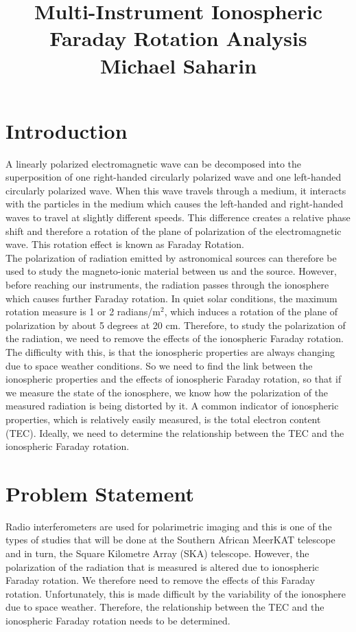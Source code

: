 \documentclass[a4paper,12pt,notitlepage]{article}
\begin{document}
\pagestyle{plain}
\title{\textbf{\huge{Multi-Instrument Ionospheric Faraday Rotation Analysis}\\
\large{Michael Saharin}}}
\maketitle

\section{Introduction}

A linearly polarized electromagnetic wave can be decomposed into the superposition of one right-handed circularly polarized wave and one left-handed circularly polarized wave. When this wave travels through a medium, it interacts with the particles in the medium which causes the left-handed and right-handed waves to travel at slightly different speeds. This difference creates a relative phase shift and therefore a rotation of the plane of polarization of the electromagnetic wave. This rotation effect is known as Faraday Rotation. \\

The polarization of radiation emitted by astronomical sources can therefore be used to study the magneto-ionic material between us and the source. However, before reaching our instruments, the radiation passes through the ionosphere which causes further Faraday rotation. In quiet solar conditions, the maximum rotation measure is 1 or 2 radians/m$^2$, which induces a rotation of the plane of polarization by about 5 degrees at 20 cm. Therefore, to study the polarization of the radiation, we need to remove the effects of the ionospheric Faraday rotation. The difficulty with this, is that the ionospheric properties are always changing due to space weather conditions. So we need to find the link between the ionospheric properties and the effects of ionospheric Faraday rotation, so that if we measure the state of the ionosphere, we know how the polarization of the measured radiation is being distorted by it. A common indicator of ionospheric properties, which is relatively easily measured, is the total electron content (TEC). Ideally, we need to determine the relationship between the TEC and the ionospheric Faraday rotation. 

\section{Problem Statement}
Radio interferometers are used for polarimetric imaging and this is one of the types of studies that will be done at the Southern African MeerKAT telescope and in turn, the Square Kilometre Array (SKA) telescope. However, the polarization of the radiation that is measured is altered due to ionospheric Faraday rotation. We therefore need to remove the effects of this Faraday rotation. Unfortunately, this is made difficult by the variability of the ionosphere due to space weather. Therefore, the relationship between the TEC and the ionospheric Faraday rotation needs to be determined.
\end{document}
